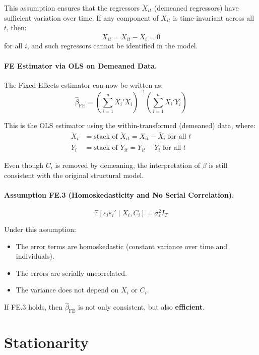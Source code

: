 \documentclass[12pt, oneside]{article}
\begin{document}
This assumption ensures that the regressors \( \ddot{X}_{it} \) (demeaned regressors) have sufficient variation over time. If any component of \( X_{it} \) is time-invariant across all \( t \), then:
\[
\ddot{X}_{it} = X_{it} - \bar{X}_i = 0
\]
for all \( i \), and such regressors cannot be identified in the model.

\paragraph{FE Estimator via OLS on Demeaned Data.}

The Fixed Effects estimator can now be written as:
\[
\hat{\beta}_{\text{FE}} = \left( \sum_{i=1}^n \ddot{X}_i' \ddot{X}_i \right)^{-1} \left( \sum_{i=1}^n \ddot{X}_i' \ddot{Y}_i \right)
\]

This is the OLS estimator using the within-transformed (demeaned) data, where:
\begin{align*}
\ddot{X}_i &= \text{stack of } \ddot{X}_{it} = X_{it} - \bar{X}_i \text{ for all } t \\
\ddot{Y}_i &= \text{stack of } \ddot{Y}_{it} = Y_{it} - \bar{Y}_i \text{ for all } t
\end{align*}

Even though \( C_i \) is removed by demeaning, the interpretation of \( \beta \) is still consistent with the original structural model.

\paragraph{Assumption FE.3 (Homoskedasticity and No Serial Correlation).}
\[
\mathbb{E}[\varepsilon_i \varepsilon_i' \mid X_i, C_i] = \sigma_\varepsilon^2 I_T
\]

Under this assumption:
\begin{itemize}
    \item The error terms are homoskedastic (constant variance over time and individuals).
    \item The errors are serially uncorrelated.
    \item The variance does not depend on \( X_i \) or \( C_i \).
\end{itemize}

\noindent If FE.3 holds, then \( \hat{\beta}_{\text{FE}} \) is not only consistent, but also \textbf{efficient}.

\section{Stationarity}
\end{document}
